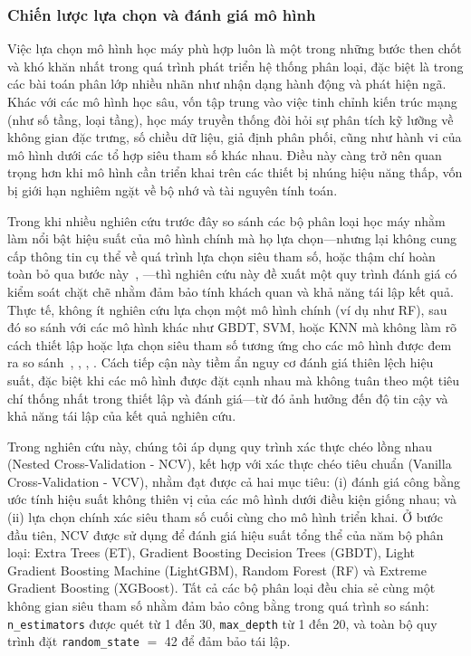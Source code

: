 \subsubsection{Chiến lược lựa chọn và đánh giá mô hình}

Việc lựa chọn mô hình học máy phù hợp luôn là một trong những bước then chốt và khó khăn nhất trong quá trình phát triển hệ thống phân loại, đặc biệt là trong các bài toán phân lớp nhiều nhãn như nhận dạng hành động và phát hiện ngã. Khác với các mô hình học sâu, vốn tập trung vào việc tinh chỉnh kiến trúc mạng (như số tầng, loại tầng), học máy truyền thống đòi hỏi sự phân tích kỹ lưỡng về không gian đặc trưng, số chiều dữ liệu, giả định phân phối, cũng như hành vi của mô hình dưới các tổ hợp siêu tham số khác nhau. Điều này càng trở nên quan trọng hơn khi mô hình cần triển khai trên các thiết bị nhúng hiệu năng thấp, vốn bị giới hạn nghiêm ngặt về bộ nhớ và tài nguyên tính toán.

Trong khi nhiều nghiên cứu trước đây so sánh các bộ phân loại học máy nhằm làm nổi bật hiệu suất của mô hình chính mà họ lựa chọn—nhưng lại không cung cấp thông tin cụ thể về quá trình lựa chọn siêu tham số, hoặc thậm chí hoàn toàn bỏ qua bước này~\cite{vi2024efficient}, \cite{chen2019detection}—thì nghiên cứu này đề xuất một quy trình đánh giá có kiểm soát chặt chẽ nhằm đảm bảo tính khách quan và khả năng tái lập kết quả. Thực tế, không ít nghiên cứu lựa chọn một mô hình chính (ví dụ như RF), sau đó so sánh với các mô hình khác như GBDT, SVM, hoặc KNN mà không làm rõ cách thiết lập hoặc lựa chọn siêu tham số tương ứng cho các mô hình được đem ra so sánh~\cite{bui2024smart}, \cite{hong2023low}, \cite{dao2022human}, \cite{thu2022real}. Cách tiếp cận này tiềm ẩn nguy cơ đánh giá thiên lệch hiệu suất, đặc biệt khi các mô hình được đặt cạnh nhau mà không tuân theo một tiêu chí thống nhất trong thiết lập và đánh giá—từ đó ảnh hưởng đến độ tin cậy và khả năng tái lập của kết quả nghiên cứu.

Trong nghiên cứu này, chúng tôi áp dụng quy trình xác thực chéo lồng nhau (Nested Cross-Validation - NCV), kết hợp với xác thực chéo tiêu chuẩn (Vanilla Cross-Validation - VCV), nhằm đạt được cả hai mục tiêu: (i) đánh giá công bằng ước tính hiệu suất không thiên vị của các mô hình dưới điều kiện giống nhau; và (ii) lựa chọn chính xác siêu tham số cuối cùng cho mô hình triển khai. Ở bước đầu tiên, NCV được sử dụng để đánh giá hiệu suất tổng thể của năm bộ phân loại: Extra Trees (ET), Gradient Boosting Decision Trees (GBDT), Light Gradient Boosting Machine (LightGBM), Random Forest (RF) và Extreme Gradient Boosting (XGBoost). Tất cả các bộ phân loại đều chia sẻ cùng một không gian siêu tham số nhằm đảm bảo công bằng trong quá trình so sánh: \texttt{n\_estimators} được quét từ 1 đến 30, \texttt{max\_depth} từ 1 đến 20, và toàn bộ quy trình đặt \texttt{random\_state} $=$ 42 để đảm bảo tái lập.

